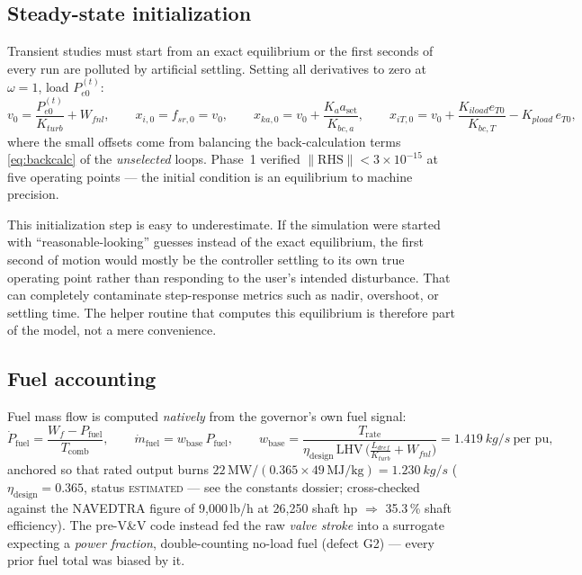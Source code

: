 \documentclass[11pt]{article}
\begin{document}
\subsection{Steady-state initialization}
\label{sec:ic}
Transient studies must start from an exact equilibrium or the first
seconds of every run are polluted by artificial settling. Setting all
derivatives to zero at $\omega=1$, load $P_{e0}^{(t)}$:
\begin{equation}
  v_0 = \frac{P_{e0}^{(t)}}{K_{turb}} + W_{fnl}, \qquad
  x_{i,0} = f_{sr,0} = v_0, \qquad
  x_{ka,0} = v_0 + \frac{K_a a_\text{set}}{K_{bc,a}}, \qquad
  x_{iT,0} = v_0 + \frac{K_{iload}e_{T0}}{K_{bc,T}} - K_{pload}\,e_{T0},
\end{equation}
where the small offsets come from balancing the back-calculation terms
\eqref{eq:backcalc} of the \emph{unselected} loops. Phase~1 verified
$\lVert\text{RHS}\rVert < 3\times10^{-15}$ at five operating points ---
the initial condition is an equilibrium to machine precision.

This initialization step is easy to underestimate. If the simulation were
started with ``reasonable-looking'' guesses instead of the exact
equilibrium, the first second of motion would mostly be the controller
settling to its own true operating point rather than responding to the
user's intended disturbance. That can completely contaminate step-response
metrics such as nadir, overshoot, or settling time. The helper routine
that computes this equilibrium is therefore part of the model, not a mere
convenience.

\subsection{Fuel accounting}
\label{sec:fuel}
Fuel mass flow is computed \emph{natively} from the governor's own fuel
signal:
\begin{equation}
  \dot P_\text{fuel} = \frac{W_f - P_\text{fuel}}{T_\text{comb}},
  \qquad
  \dot m_\text{fuel} = w_\text{base}\, P_\text{fuel},
  \qquad
  w_\text{base} = \frac{T_\text{rate}}{\eta_\text{design}\, \text{LHV} \,
      \bigl(\tfrac{L_{dref}}{K_{turb}} + W_{fnl}\bigr)} = \SI{1.419}{kg/s}\ \text{per pu},
\end{equation}
anchored so that rated output burns $22\,\text{MW}/(0.365 \times
49\,\text{MJ/kg}) = \SI{1.230}{kg/s}$ ($\eta_\text{design} = 0.365$,
status \textsc{estimated} --- see the constants dossier; cross-checked
against the NAVEDTRA figure of 9{,}000\,lb/h at 26{,}250 shaft hp
$\Rightarrow$ 35.3\,\% shaft efficiency). The pre-V\&V code instead fed
the raw \emph{valve stroke} into a surrogate expecting a \emph{power
fraction}, double-counting no-load fuel (defect G2) --- every prior fuel
total was biased by it.
\end{document}
